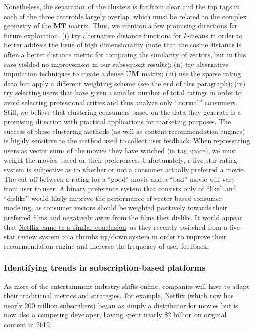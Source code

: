 \documentclass[dvipsnames]{article}
\begin{document}
Nonetheless, the separation of the clusters is far from clear and the top tags in each of the three centroids largely overlap, which must be related to the complex geometry of the $\mathbf{MT}$ matrix. Thus, we mention a few promising directions for future exploration: (i) try alternative distance functions for $k$-means in order to better address the issue of high dimensionality (note that the cosine distance is often a better distance metric for comparing the similarity of vectors, but in this case yielded no improvement in our subsequent results); (ii) try alternative imputation techniques to create a dense $\mathbf{UM}$ matrix; (iii) use the sparse rating data but apply a different weighting scheme (see the end of this paragraph); (iv) try selecting users that have given a smaller number of total ratings in order to avoid selecting professional critics and thus analyze only ``normal'' consumers. Still, we believe that clustering consumers based on the data they generate is a promising direction with practical applications for marketing purposes. The success of these clustering methods (as well as content recommendation engines) is highly sensitive to the method used to collect user feedback. When representing users as vector sums of the movies they have watched (in tag space), we must weight the movies based on their preferences. Unfortunately, a five-star rating system is subjective as to whether or not a consumer actually preferred a movie. The cut-off between a rating for a ``good'' movie and a ``bad'' movie will vary from user to user. A binary preference system that consists only of ``like'' and ``dislike'' would likely improve the performance of vector-based consumer modeling, as consumer vectors should be weighted positively towards their preferred films and negatively away from the films they dislike. It would appear that \href{https://about.netflix.com/en/news/goodbye-stars-hello-thumbs}{Netflix came to a similar conclusion}, as they recently switched from a five-star review system to a thumbs up/down system in order to improve their recommendation engine and increase the frequency of user feedback.

\subsubsection*{Identifying trends in subscription-based platforms}

As more of the entertainment industry shifts online, companies will have to adapt their traditional metrics and strategies. For example, Netflix (which now has nearly 200 million subscribers) began as simply a distributor for movies but is now also a competing developer, having spent nearly \$2 billion on original content in 2019.
\end{document}
